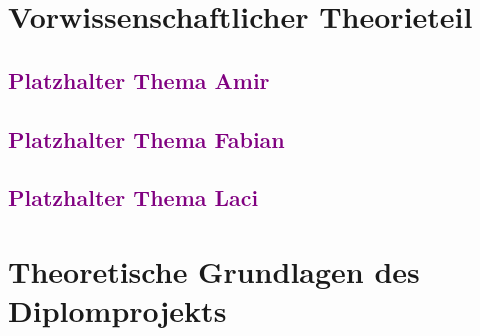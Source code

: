 \documentclass[titlepage,12pt,twoside]{article}
\begin{document}
\section{Vorwissenschaftlicher Theorieteil}

\subsection{\textcolor{purple}{Platzhalter Thema Amir}}
\subsection{\textcolor{purple}{Platzhalter Thema Fabian}}
\subsection{\textcolor{purple}{Platzhalter Thema Laci}}

\section{Theoretische Grundlagen des Diplomprojekts}
\end{document}
